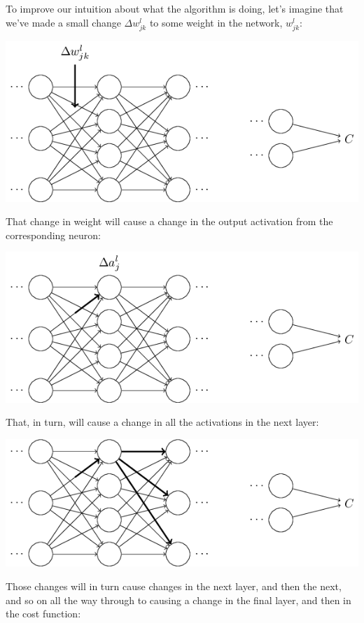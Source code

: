 \documentclass[a4paper,twoside,10pt]{book}
\begin{document}
To improve our intuition about what the algorithm is doing, let's imagine that we've made a small change $\Delta{}w^l_{jk}$ to some weight in the network, $w^l_{jk}$:
\begin{center}
	\includegraphics[scale=0.5]{./figures/ch2/tikz22}
\end{center}
That change in weight will cause a change in the output activation from the corresponding neuron:
\begin{center}
	\includegraphics[scale=0.5]{./figures/ch2/tikz23}
\end{center}
That, in turn, will cause a change in all the activations in the next layer:
\begin{center}
	\includegraphics[scale=0.5]{./figures/ch2/tikz24}
\end{center}
Those changes will in turn cause changes in the next layer, and then the next, and so on all the way through to causing a change in the final layer, and then in the cost function:
\end{document}
